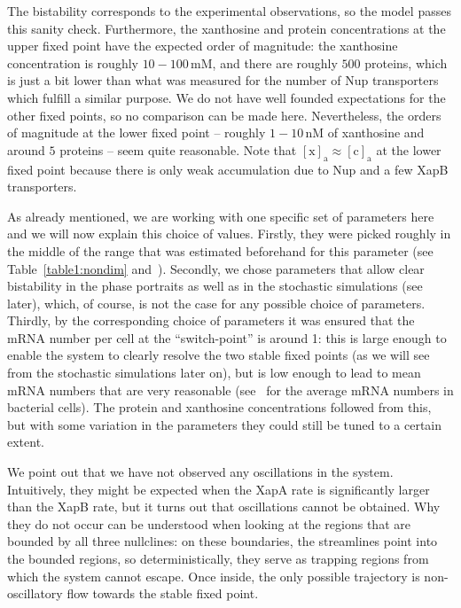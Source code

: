 \documentclass[10pt,letterpaper]{article}
\newcommand{\unit}[1]{\,\mathrm{#1}}
\newcommand{\n}[1]{\mathrm{#1}}
\begin{document}
	The bistability corresponds to the experimental observations, so the model passes this
	sanity check. Furthermore, the xanthosine and protein concentrations at the
	upper fixed point have the expected order of magnitude: the xanthosine
	concentration is roughly $10-100 \unit{mM}$, and there are roughly $500$
	proteins, which is just a bit lower than what was measured for the number of
	Nup transporters~\cite{Li2014} which fulfill a similar purpose. We do not
	have well founded expectations for the other fixed points, so no comparison
	can be made here. Nevertheless, the orders of magnitude at the lower fixed
	point -- roughly $1-10 \unit{nM}$ of xanthosine and around $5$ proteins --
	seem quite reasonable. Note that $\n{[x]_a} \approx \n{[c]_a}$ at the
	lower fixed point because there is only weak accumulation due to Nup and a
	few XapB transporters.
	
	As already mentioned, we are working with one specific set of parameters
	here and we will now explain this choice of values. Firstly, they were
	picked roughly in the middle of the range that was estimated beforehand for this parameter (see Table~\ref{table1:nondim} and~). Secondly, we
	chose parameters that allow clear bistability in the phase portraits as well as in the
	stochastic simulations (see later), which, of course, is not the case for any possible choice of parameters. Thirdly, by the corresponding choice of
	parameters it was ensured that the mRNA number per cell at the
	``switch-point'' is around 1: this is large enough to enable the system to
	clearly resolve the two stable fixed points (as we will see from the
	stochastic simulations later on), but is low enough to lead to mean mRNA
	numbers that are very reasonable (see~\cite{Milo2016} for the average mRNA
	numbers in bacterial cells). The protein and xanthosine
	concentrations followed from this, but with some variation in the parameters
	they could still be tuned to a certain extent.
	
	We point out that we have not observed any oscillations in the
	system. Intuitively, they might be expected when the XapA rate is
	significantly larger than the XapB rate, but it turns out that oscillations
	cannot be obtained. Why they do not occur can be understood when looking at the regions that
	are bounded by all three nullclines: on these boundaries, the streamlines
	point into the bounded regions, so deterministically, they serve as
	trapping regions from which the system cannot escape. Once inside, the only
	possible trajectory is non-oscillatory flow towards the stable fixed point.
	
\end{document}
